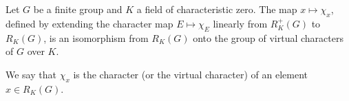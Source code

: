 Let $G$ be a finite group and $K$ a field of characteristic zero. The map $x \mapsto \chi_x$, defined by extending the character map $E \mapsto \chi_E$ linearly from $R_K^+(G)$ to $R_K(G)$, is an isomorphism from $R_K(G)$ onto the group of virtual characters of $G$ over $K$.

We say that $\chi_x$ is the character (or the virtual character) of an element $x \in R_K(G)$.
